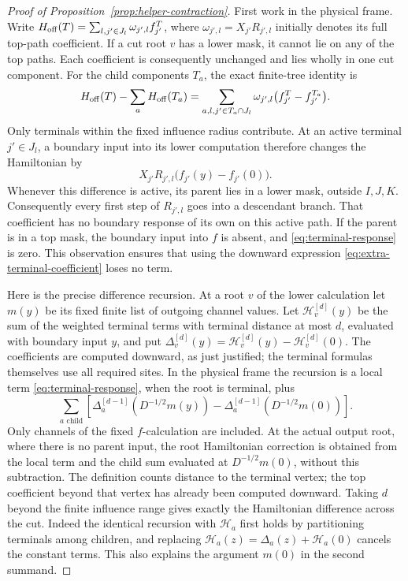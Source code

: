 \begin{proof}[Proof of Proposition~\ref{prop:helper-contraction}]
First work in the physical frame.  Write
\(H_{\rm off}(T)=\sum_{l,j'\in J_l}\omega_{j',l}f_{j'}^T\),
where \(\omega_{j',l}=X_{j'}R_{j',l}\) initially denotes its full
top-path coefficient.  If a cut root \(v\) has a lower mask, it
cannot lie on any of the top paths.  Each coefficient is consequently
unchanged and lies wholly in one cut component.  For the child
components \(T_a\), the exact finite-tree identity is
\begin{equation}
 H_{\rm off}(T)-\sum_aH_{\rm off}(T_a)
   =\sum_{a,l,j'\in T_a\cap J_l}\omega_{j',l}
          \bigl(f_{j'}^T-f_{j'}^{T_a}\bigr).
 \label{eq:physical-lower-cut-identity}
\end{equation}
Only terminals within the fixed influence radius contribute.  At an
active terminal \(j'\in J_l\), a boundary input into its lower
computation therefore changes the Hamiltonian by
\begin{equation}
 X_{j'}R_{j',l}\bigl(f_{j'}(y)-f_{j'}(0)\bigr).
 \label{eq:terminal-response}
\end{equation}
Whenever this difference is active, its parent lies in a lower mask,
outside \(I,J,K\).  Consequently every first step of
\(R_{j',l}\) goes into a descendant branch.  That coefficient has
no boundary response of its own on this active path.  If the parent
is in a top mask, the boundary input into \(f\) is absent, and
\eqref{eq:terminal-response} is zero.  This observation ensures that
using the downward expression
\eqref{eq:extra-terminal-coefficient} loses no term.

Here is the precise difference recursion.  At a root \(v\) of the
lower calculation let \(m(y)\) be its fixed finite list of outgoing
channel values.  Let \(\mathcal H_v^{[d]}(y)\) be the sum of the
weighted terminal terms with terminal distance at most \(d\),
evaluated with boundary input \(y\), and put
\(\Delta_v^{[d]}(y)=\mathcal H_v^{[d]}(y)-\mathcal H_v^{[d]}(0)\).
The coefficients are computed downward, as just justified; the
terminal formulas themselves use all required sites.  In the
physical frame the recursion is a local term
\eqref{eq:terminal-response}, when the root is terminal, plus
\begin{equation}
 \sum_{a\text{ child}}
 \left[
   \Delta_a^{[d-1]}(D^{-1/2}m(y))
   -\Delta_a^{[d-1]}(D^{-1/2}m(0))
 \right].
 \label{eq:additive-response-recursion}
\end{equation}
Only channels of the fixed \(f\)-calculation are included.  At the
actual output root, where there is no parent input, the root
Hamiltonian correction is obtained from the local term and the
child sum evaluated at \(D^{-1/2}m(0)\), without this subtraction.
The definition counts distance to the terminal vertex; the top
coefficient beyond that vertex has already been computed downward.
Taking \(d\) beyond the finite influence range gives exactly the
Hamiltonian difference across the cut.  Indeed the identical
recursion with \(\mathcal H_a\) first holds by partitioning
terminals among children, and replacing
\(\mathcal H_a(z)=\Delta_a(z)+\mathcal H_a(0)\) cancels the
constant terms.  This also explains the argument \(m(0)\) in the
second summand.


\end{proof}
